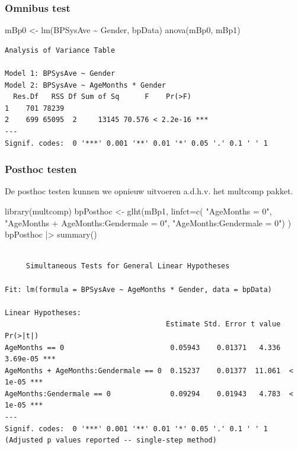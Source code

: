 \documentclass[
  dutch,
  letterpaper,
  12pt]{book}
\newenvironment{Shaded}{\begin{snugshade}}{\end{snugshade}}
\newcommand{\AttributeTok}[1]{\textcolor[rgb]{0.40,0.45,0.13}{#1}}
\newcommand{\FunctionTok}[1]{\textcolor[rgb]{0.28,0.35,0.67}{#1}}
\newcommand{\NormalTok}[1]{\textcolor[rgb]{0.00,0.23,0.31}{#1}}
\newcommand{\OtherTok}[1]{\textcolor[rgb]{0.00,0.23,0.31}{#1}}
\newcommand{\SpecialCharTok}[1]{\textcolor[rgb]{0.37,0.37,0.37}{#1}}
\newcommand{\StringTok}[1]{\textcolor[rgb]{0.13,0.47,0.30}{#1}}
\theoremstyle{definition}
\theoremstyle{definition}
\theoremstyle{definition}
\theoremstyle{remark}
\begin{document}
\subsubsection{Omnibus test}\label{omnibus-test}

\begin{Shaded}
\begin{Highlighting}[]
\NormalTok{mBp0 }\OtherTok{\textless{}{-}} \FunctionTok{lm}\NormalTok{(BPSysAve }\SpecialCharTok{\textasciitilde{}}\NormalTok{ Gender, bpData)}
\FunctionTok{anova}\NormalTok{(mBp0, mBp1)}
\end{Highlighting}
\end{Shaded}

\begin{verbatim}
Analysis of Variance Table

Model 1: BPSysAve ~ Gender
Model 2: BPSysAve ~ AgeMonths * Gender
  Res.Df   RSS Df Sum of Sq      F    Pr(>F)    
1    701 78239                                  
2    699 65095  2     13145 70.576 < 2.2e-16 ***
---
Signif. codes:  0 '***' 0.001 '**' 0.01 '*' 0.05 '.' 0.1 ' ' 1
\end{verbatim}

\subsubsection{Posthoc testen}\label{posthoc-testen}

De posthoc testen kunnen we opnieuw uitvoeren a.d.h.v. het multcomp
pakket.

\begin{Shaded}
\begin{Highlighting}[]
\FunctionTok{library}\NormalTok{(multcomp)}
\NormalTok{bpPosthoc }\OtherTok{\textless{}{-}} \FunctionTok{glht}\NormalTok{(mBp1, }\AttributeTok{linfct=}\FunctionTok{c}\NormalTok{(}
  \StringTok{"AgeMonths = 0"}\NormalTok{,}
  \StringTok{"AgeMonths + AgeMonths:Gendermale = 0"}\NormalTok{,}
  \StringTok{"AgeMonths:Gendermale = 0"}\NormalTok{)}
\NormalTok{  )}
\NormalTok{bpPosthoc }\SpecialCharTok{|\textgreater{}} \FunctionTok{summary}\NormalTok{()}
\end{Highlighting}
\end{Shaded}

\begin{verbatim}

     Simultaneous Tests for General Linear Hypotheses

Fit: lm(formula = BPSysAve ~ AgeMonths * Gender, data = bpData)

Linear Hypotheses:
                                      Estimate Std. Error t value Pr(>|t|)    
AgeMonths == 0                         0.05943    0.01371   4.336 3.69e-05 ***
AgeMonths + AgeMonths:Gendermale == 0  0.15237    0.01377  11.061  < 1e-05 ***
AgeMonths:Gendermale == 0              0.09294    0.01943   4.783  < 1e-05 ***
---
Signif. codes:  0 '***' 0.001 '**' 0.01 '*' 0.05 '.' 0.1 ' ' 1
(Adjusted p values reported -- single-step method)
\end{verbatim}
\end{document}
